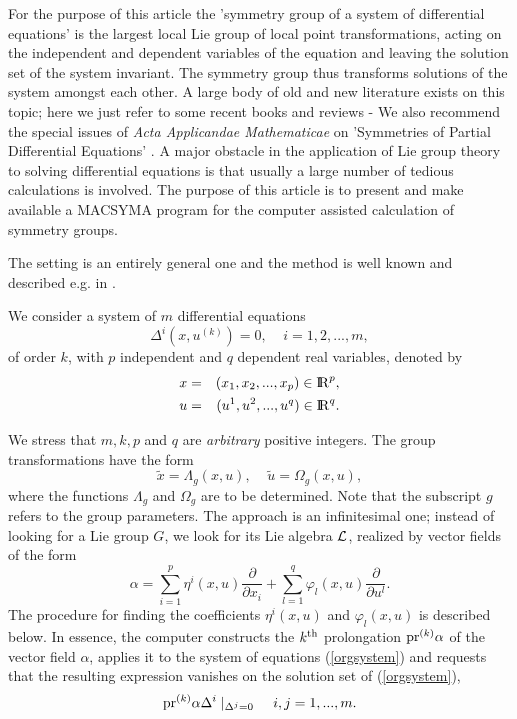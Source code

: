 For the purpose of this article the 'symmetry group of a system of differential
equations' is the largest local Lie group of local point transformations,
acting on the independent and dependent variables of the equation and leaving
the solution set of the system invariant. The symmetry group thus transforms
solutions of the system amongst each other.
A large body of old and new literature exists on this topic; here we just
refer to some recent books and reviews 
\cite{olverbook,amesbook}-\cite{winternitzkluwer}
We also recommend the special issues of {\em Acta Applicandae Mathematicae}
on 'Symmetries of Partial Differential Equations' \cite{specialissues}. 
\vskip 2pt
\noindent
A major obstacle in the application of Lie group theory to solving differential
equations is that usually a large number of tedious calculations is involved.
The purpose of this article is to present and make available a MACSYMA program
for the computer assisted calculation of symmetry groups.

The setting is an entirely general one and the method is well known and
described e.g. in \cite{olverbook}. 
\vskip 2pt

\nopagebreak
We consider a system of $m$ differential equations 
\begin{equation}
{\Delta}^{i} (x, u^{(k)})= 0, \;\;\;\; i = 1,2, ... , m, \label{orgsystem}
\end{equation}
of order $k$, with $p$ independent and $q$ dependent real
variables, denoted by
\begin{eqnarray}
x & = & (x_1 , x_2, ... , x_p ) \in {{\rm I\kern-.20em R}}^p , \label{variablesx}\\
u & = & (u^1 , u^2 , ... , u^q ) \in {{\rm I\kern-.20em R}}^q. \label{variablesu}
\end{eqnarray}

\nopagebreak
We stress that $m, k, p $ and $q$ are {\em arbitrary} positive integers.
The group transformations have the form
\begin{equation}
\tilde{x} = \Lambda_g (x,u), \;\;\;\; \tilde{u} = \Omega_g (x,u), 
\label{transform}
\end{equation}
where the functions 
$ \Lambda_g$ and $ \Omega_g $ are to be determined. Note that the subscript
$g$ refers to the group parameters. 
The approach is an infinitesimal one; instead of looking for a Lie group
$G$, we look for its Lie algebra $\cal L$, realized by vector fields of the
form 
\begin{equation}
\alpha = \sum_{i=1}^{p} \eta^i (x,u) 
\frac{\partial}{\partial x_i} + \sum_{l=1}^{q} \varphi_{l} (x,u)
\frac{\partial}{\partial u^{l}}.
\label{vectorfield}
\end{equation}
\pagebreak
The procedure \cite{olverbook} for finding the coefficients
$\eta^i (x,u)$ and $\varphi_l (x,u)$ 
is described below.
In essence, the computer constructs the $k^{\rm th}$ prolongation 
${\rm pr}^{(k)} \alpha $ of the vector field $\alpha$, applies it to the
system of equations (\ref{orgsystem}) and requests that the resulting 
expression vanishes on the solution set of (\ref{orgsystem}),
\begin{equation}
{\rm pr}^{(k)} \alpha \Delta^i  \mid_{\Delta^{j} = 0} 
\;\;\;\; i,j  = 1, ... , m. 
\label{prolongation}
\end{equation}


